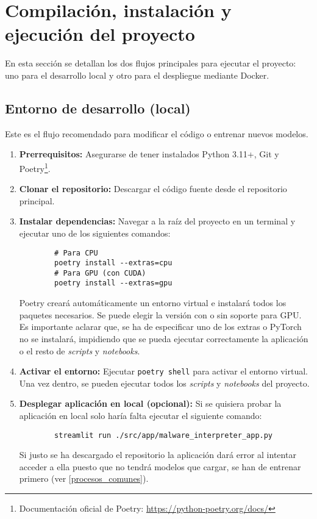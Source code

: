 \section{Compilación, instalación y ejecución del proyecto}
En esta sección se detallan los dos flujos principales para ejecutar el proyecto: uno para el desarrollo local y otro para el despliegue mediante Docker.

\subsection{Entorno de desarrollo (local)} \label{entorno_desarrollo}
Este es el flujo recomendado para modificar el código o entrenar nuevos modelos.
\begin{enumerate}
	\item \textbf{Prerrequisitos:} Asegurarse de tener instalados Python 3.11+, Git y Poetry\footnote{Documentación oficial de Poetry: \url{https://python-poetry.org/docs/}}.
	
	\item \textbf{Clonar el repositorio:} Descargar el código fuente desde el repositorio principal.
	
	\item \textbf{Instalar dependencias:} Navegar a la raíz del proyecto en un terminal y ejecutar uno de los siguientes comandos:
	
	\vspace*{-1em}
	\begin{verbatim}
		# Para CPU
		poetry install --extras=cpu
		# Para GPU (con CUDA)
		poetry install --extras=gpu
	\end{verbatim}
	\vspace*{-1em}
	
	Poetry creará automáticamente un entorno virtual e instalará todos los paquetes necesarios. Se puede elegir la versión con o sin soporte para GPU. Es importante aclarar que, se ha de especificar uno de los extras o PyTorch no se instalará, impidiendo que se pueda ejecutar correctamente la aplicación o el resto de \textit{scripts} y \textit{notebooks}.

	\item \textbf{Activar el entorno:} Ejecutar \texttt{poetry shell} para activar el entorno virtual. Una vez dentro, se pueden ejecutar todos los \textit{scripts} y \textit{notebooks} del proyecto.
	
	\item\textbf{ Desplegar aplicación en local (opcional):} Si se quisiera probar la aplicación en local solo haría falta ejecutar el siguiente comando:
	
	\begin{verbatim}
		streamlit run ./src/app/malware_interpreter_app.py
	\end{verbatim}
	
	Si justo se ha descargado el repositorio la aplicación dará error al intentar acceder a ella puesto que no tendrá modelos que cargar, se han de entrenar primero (ver \ref{procesos_comunes}).
\end{enumerate}

